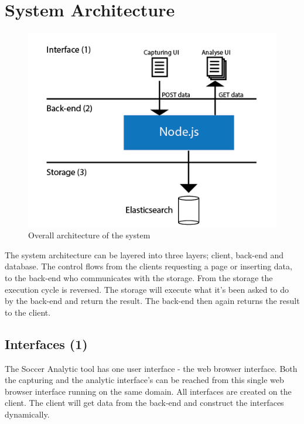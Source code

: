 

\section{System Architecture}

\begin{figure}[ht!]
\centering
\includegraphics[width=1\textwidth]{images/architecture/architecture.png}
\caption{Overall architecture of the system }
\label{overflow}
\end{figure}

The system architecture can be layered into three layers; client, back-end and database. The control flows from the clients requesting a page or inserting data, to the back-end who communicates with the storage. From the storage the execution cycle is reversed. The storage will execute what it’s been asked to do by the back-end and return the result. The back-end then again returns the result to the client.

\subsection{Interfaces (1)}

The Soccer Analytic tool has one user interface - the web browser interface. Both the capturing and the analytic interface’s can be reached from this single web browser interface running on the same domain. All interfaces are created on the client. The client will get data from the back-end and construct the interfaces dynamically. 

